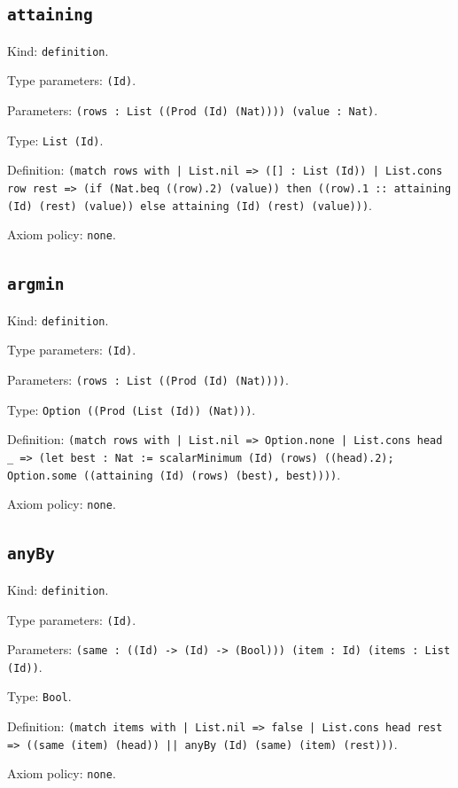 \documentclass[11pt]{article}
\begin{document}
\subsection*{\texttt{attaining}}
\noindent Kind: \texttt{definition}.\par
\noindent Type parameters: \texttt{(Id)}.\par
\noindent Parameters: \texttt{(rows : List ((Prod (Id) (Nat)))) (value : Nat)}.\par
\noindent Type: \texttt{List (Id)}.\par
\noindent Definition: \texttt{(match rows with | List.nil => ([] : List (Id)) | List.cons row rest => (if (Nat.beq ((row).2) (value)) then ((row).1 :: attaining (Id) (rest) (value)) else attaining (Id) (rest) (value)))}.\par
\noindent Axiom policy: \texttt{none}.\par
\subsection*{\texttt{argmin}}
\noindent Kind: \texttt{definition}.\par
\noindent Type parameters: \texttt{(Id)}.\par
\noindent Parameters: \texttt{(rows : List ((Prod (Id) (Nat))))}.\par
\noindent Type: \texttt{Option ((Prod (List (Id)) (Nat)))}.\par
\noindent Definition: \texttt{(match rows with | List.nil => Option.none | List.cons head \_ => (let best : Nat := scalarMinimum (Id) (rows) ((head).2); Option.some ((attaining (Id) (rows) (best), best))))}.\par
\noindent Axiom policy: \texttt{none}.\par
\subsection*{\texttt{anyBy}}
\noindent Kind: \texttt{definition}.\par
\noindent Type parameters: \texttt{(Id)}.\par
\noindent Parameters: \texttt{(same : ((Id) -> (Id) -> (Bool))) (item : Id) (items : List (Id))}.\par
\noindent Type: \texttt{Bool}.\par
\noindent Definition: \texttt{(match items with | List.nil => false | List.cons head rest => ((same (item) (head)) || anyBy (Id) (same) (item) (rest)))}.\par
\noindent Axiom policy: \texttt{none}.\par
\end{document}

